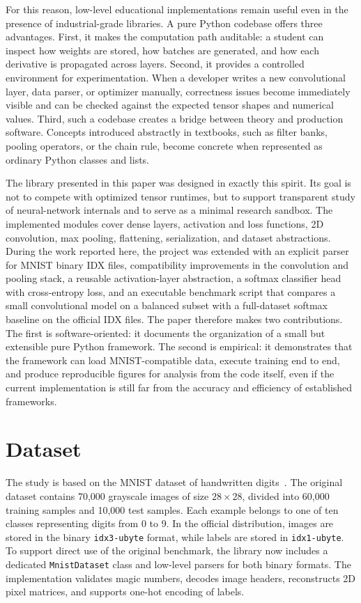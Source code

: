 \documentclass[]{ceurart}
\begin{document}
For this reason, low-level educational implementations remain useful even in the presence of industrial-grade libraries. A pure Python codebase offers three advantages. First, it makes the computation path auditable: a student can inspect how weights are stored, how batches are generated, and how each derivative is propagated across layers. Second, it provides a controlled environment for experimentation. When a developer writes a new convolutional layer, data parser, or optimizer manually, correctness issues become immediately visible and can be checked against the expected tensor shapes and numerical values. Third, such a codebase creates a bridge between theory and production software. Concepts introduced abstractly in textbooks, such as filter banks, pooling operators, or the chain rule, become concrete when represented as ordinary Python classes and lists.

The library presented in this paper was designed in exactly this spirit. Its goal is not to compete with optimized tensor runtimes, but to support transparent study of neural-network internals and to serve as a minimal research sandbox. The implemented modules cover dense layers, activation and loss functions, 2D convolution, max pooling, flattening, serialization, and dataset abstractions. During the work reported here, the project was extended with an explicit parser for MNIST binary IDX files, compatibility improvements in the convolution and pooling stack, a reusable activation-layer abstraction, a softmax classifier head with cross-entropy loss, and an executable benchmark script that compares a small convolutional model on a balanced subset with a full-dataset softmax baseline on the official IDX files. The paper therefore makes two contributions. The first is software-oriented: it documents the organization of a small but extensible pure Python framework. The second is empirical: it demonstrates that the framework can load MNIST-compatible data, execute training end to end, and produce reproducible figures for analysis from the code itself, even if the current implementation is still far from the accuracy and efficiency of established frameworks.

\section{Dataset}
The study is based on the MNIST dataset of handwritten digits~\cite{lecun1998}. The original dataset contains 70,000 grayscale images of size $28 \times 28$, divided into 60,000 training samples and 10,000 test samples. Each example belongs to one of ten classes representing digits from 0 to 9. In the official distribution, images are stored in the binary \texttt{idx3-ubyte} format, while labels are stored in \texttt{idx1-ubyte}. To support direct use of the original benchmark, the library now includes a dedicated \texttt{MnistDataset} class and low-level parsers for both binary formats. The implementation validates magic numbers, decodes image headers, reconstructs 2D pixel matrices, and supports one-hot encoding of labels.
\end{document}
